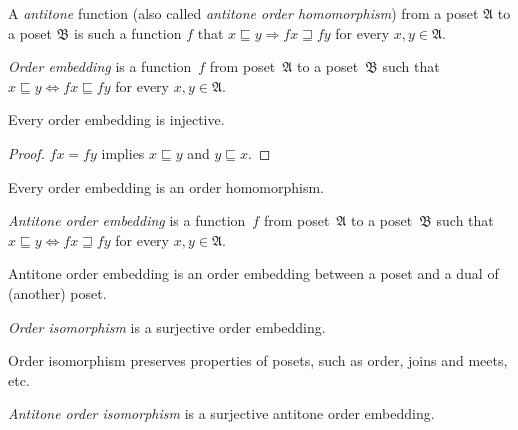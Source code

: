 \begin{defn}
A \emph{antitone} function (also called \emph{antitone
order homomorphism}) from a poset $\mathfrak{A}$ to a poset $\mathfrak{B}$
is such a function $f$ that $x\sqsubseteq y\Rightarrow fx\sqsupseteq fy$
for every $x,y\in\mathfrak{A}$.
\end{defn}

\begin{defn}
\emph{Order embedding} is a function~$f$ from poset~$\mathfrak{A}$ to a poset~$\mathfrak{B}$
such that $x\sqsubseteq y\Leftrightarrow fx\sqsubseteq fy$ for every $x,y\in\mathfrak{A}$.
\end{defn}

\begin{prop}
Every order embedding is injective.
\end{prop}

\begin{proof}
$fx=fy$ implies $x\sqsubseteq y$ and $y\sqsubseteq x$.
\end{proof}

\begin{obvious}
Every order embedding is an order homomorphism.
\end{obvious}

\begin{defn}
\emph{Antitone order embedding} is a function~$f$ from poset~$\mathfrak{A}$ to a poset~$\mathfrak{B}$
such that $x\sqsubseteq y\Leftrightarrow fx\sqsupseteq fy$ for every $x,y\in\mathfrak{A}$.
\end{defn}

\begin{obvious}
Antitone order embedding is an order embedding between a poset and a dual of (another) poset.
\end{obvious}

\begin{defn}
\emph{Order isomorphism} is a surjective
order embedding.
\end{defn}
Order isomorphism preserves properties of posets, such as order, joins
and meets, etc.
\begin{defn}
\emph{Antitone order isomorphism}
is a surjective antitone order embedding.
\end{defn}

